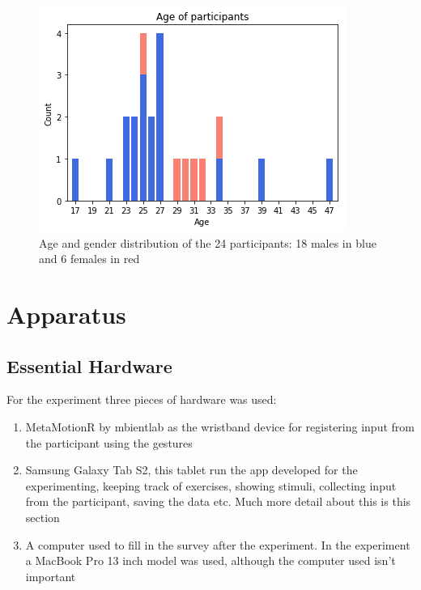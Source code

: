 \begin{figure}[h!]
    \centering
    \includegraphics[width=.6\textwidth]{figures/age_gender.png}
    \caption{Age and gender distribution of the 24 participants: 18 males in blue and 6 females in red}
    \label{age_gender}
\end{figure}



\section{Apparatus}
\subsection{Essential Hardware}
For the experiment three pieces of hardware was used:
\begin{enumerate}
\item MetaMotionR by mbientlab\cite{mbient} as the wristband device for registering input from the participant using the gestures
\item Samsung Galaxy Tab S2\cite{samsung}, this tablet run the app developed for the experimenting, keeping track of exercises, showing stimuli, collecting input from the participant, saving the data etc. Much more detail about this is this section
\item A computer used to fill in the survey after the experiment. In the experiment a MacBook Pro 13 inch model was used, although the computer used isn't important
\end{enumerate}

